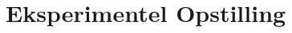 \documentclass[A2_main]{subfiles}
\begin{document}
\section{Eksperimentel Opstilling}
\end{document}
